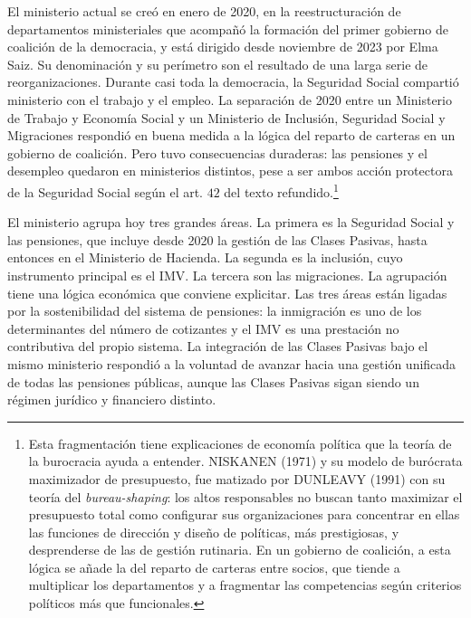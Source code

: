 \documentclass[10pt,a4paper]{article}
\begin{document}
El ministerio actual se creó en enero de 2020, en la reestructuración de departamentos ministeriales que acompañó la formación del primer gobierno de coalición de la democracia, y está dirigido desde noviembre de 2023 por Elma Saiz. Su denominación y su perímetro son el resultado de una larga serie de reorganizaciones. Durante casi toda la democracia, la Seguridad Social compartió ministerio con el trabajo y el empleo. La separación de 2020 entre un Ministerio de Trabajo y Economía Social y un Ministerio de Inclusión, Seguridad Social y Migraciones respondió en buena medida a la lógica del reparto de carteras en un gobierno de coalición. Pero tuvo consecuencias duraderas: las pensiones y el desempleo quedaron en ministerios distintos, pese a ser ambos acción protectora de la Seguridad Social según el art. $42$ del texto refundido.\footnote{%
    Esta fragmentación tiene explicaciones de economía política que la teoría de la burocracia ayuda a entender. NISKANEN (1971) y su modelo de burócrata maximizador de presupuesto, fue matizado por DUNLEAVY (1991) con su teoría del \textit{bureau-shaping}: los altos responsables no buscan tanto maximizar el presupuesto total como configurar sus organizaciones para concentrar en ellas las funciones de dirección y diseño de políticas, más prestigiosas, y desprenderse de las de gestión rutinaria. En un gobierno de coalición, a esta lógica se añade la del reparto de carteras entre socios, que tiende a multiplicar los departamentos y a fragmentar las competencias según criterios políticos más que funcionales.
}

El ministerio agrupa hoy tres grandes áreas. La primera es la Seguridad Social y las pensiones, que incluye desde 2020 la gestión de las Clases Pasivas, hasta entonces en el Ministerio de Hacienda. La segunda es la inclusión, cuyo instrumento principal es el IMV. La tercera son las migraciones. La agrupación tiene una lógica económica que conviene explicitar. Las tres áreas están ligadas por la sostenibilidad del sistema de pensiones: la inmigración es uno de los determinantes del número de cotizantes y el IMV es una prestación no contributiva del propio sistema. La integración de las Clases Pasivas bajo el mismo ministerio respondió a la voluntad de avanzar hacia una gestión unificada de todas las pensiones públicas, aunque las Clases Pasivas sigan siendo un régimen jurídico y financiero distinto.
\end{document}
